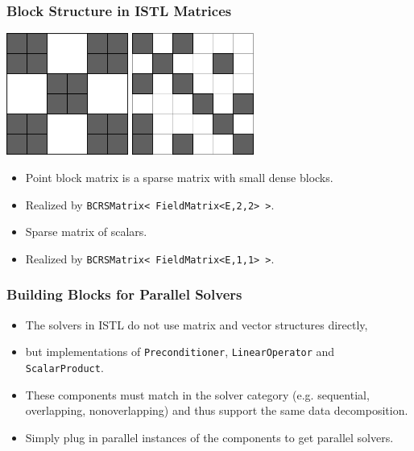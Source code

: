 \begin{frame}[fragile]
\frametitle{Block Structure in ISTL Matrices}
\begin{block}{}
\includegraphics[width=0.3\textwidth]{./EPS/pointblockmatrix}\hfill
\includegraphics[width=0.3\textwidth]{./EPS/scalarmatrix}

\begin{minipage}{0.48\textwidth}
  \begin{itemize}
  \item  Point block matrix is a sparse matrix with small dense
blocks.
\item Realized by \lstinline[basicstyle=\tiny]!BCRSMatrix< FieldMatrix<E,2,2> >!. 
  \end{itemize}
\end{minipage}
\begin{minipage}{0.48\textwidth}
  \begin{itemize}
  \item Sparse matrix of scalars.
  \item Realized by \lstinline[basicstyle=\tiny]!BCRSMatrix< FieldMatrix<E,1,1> >!.
  \end{itemize}
\end{minipage}
\end{block}
\end{frame}


\begin{frame}
  \frametitle{Building Blocks for Parallel Solvers}

  \begin{itemize}
  \item The solvers in ISTL do not use matrix and vector structures
    directly,
  \item but implementations of \lstinline!Preconditioner!,
    \lstinline!LinearOperator! and \lstinline!ScalarProduct!.
  \item These components must match in the solver category
    (e.g. sequential, overlapping, nonoverlapping) and thus support
    the same data decomposition.
  \item Simply plug in parallel instances of the components to get
    parallel solvers.
  \end{itemize}
\end{frame}


